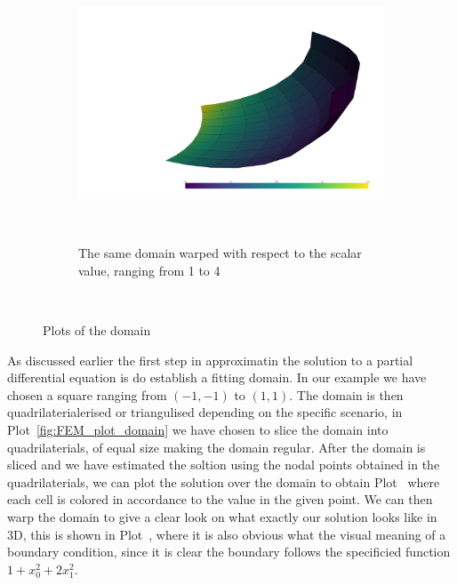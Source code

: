 \begin{figure}[H]
\begin{subfigure}{.3\textwidth}
    \end{subfigure}
    \begin{subfigure}{.3\textwidth}
        \centering
        \includegraphics[width=\textwidth]{Afsnit/Application/figurer/screenshot_3.jpeg}
        \caption{The same domain warped with respect to the scalar value, ranging from 1 to 4}~\label{fig:FEM_plot_3D}
    \end{subfigure}
    \caption{Plots of the domain}~\label{fig:FEM_plots}
\end{figure}

As discussed earlier the first step in approximatin the solution to a partial differential equation is do establish a fitting domain. In our example we have chosen a square ranging from $(-1,-1)$ to $(1,1)$.
The domain is then quadrilaterialerised or triangulised depending on the specific scenario, in Plot~\ref{fig:FEM_plot_domain} we have chosen to slice the domain into quadrilaterials, of equal size making the domain regular.
After the domain is sliced and we have estimated the soltion using the nodal points obtained in the quadrilaterials, we can plot the solution over the domain to obtain Plot~ where each cell is colored in accordance to the value in the given point.
We can then warp the domain to give a clear look on what exactly our solution looks like in 3D, this is shown in Plot~, where it is also obvious what the visual meaning of a boundary condition, since it is clear the boundary follows the specificied function $1 + x_0^2 + 2x_1^2$.